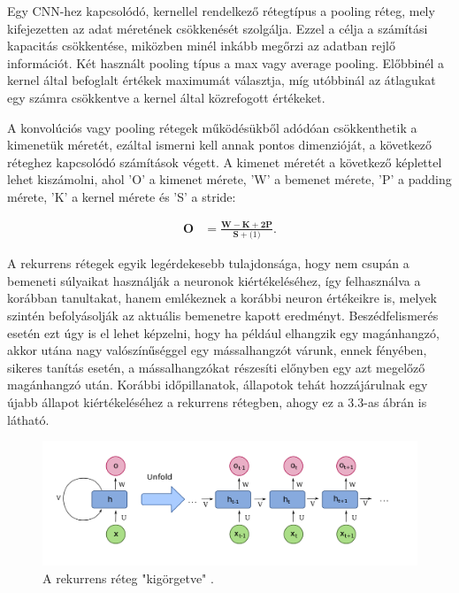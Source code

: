 Egy CNN-hez kapcsolódó, kernellel rendelkező rétegtípus a pooling réteg, mely kifejezetten az adat méretének csökkenését szolgálja. Ezzel a célja a számítási kapacitás csökkentése, miközben minél inkább megőrzi az adatban rejlő információt. Két használt pooling típus a max vagy average pooling. Előbbinél a kernel által befoglalt értékek maximumát választja, míg utóbbinál az átlagukat egy számra csökkentve a kernel által közrefogott értékeket.

A konvolúciós vagy pooling rétegek működésükből adódóan csökkenthetik a kimenetük méretét, ezáltal ismerni kell annak pontos dimenzióját, a következő réteghez kapcsolódó számítások végett. A kimenet méretét a következő képlettel lehet kiszámolni, ahol ’O’ a kimenet mérete, ’W’ a bemenet mérete, ’P’ a padding mérete, ’K’ a kernel mérete és ’S’ a stride:

\begin{align}
\mathbf{O}&=\frac{\mathbf{W}-\mathbf{K}+\mathbf{2P}}{\mathbf{S}+\mathbf(1)}.
\end{align}

A rekurrens rétegek\cite{rnn} egyik legérdekesebb tulajdonsága, hogy nem csupán a bemeneti súlyaikat használják a neuronok kiértékeléséhez, így felhasználva a korábban tanultakat, hanem emlékeznek a korábbi neuron értékeikre is, melyek szintén befolyásolják az aktuális bemenetre kapott eredményt. Beszédfelismerés esetén ezt úgy is el lehet képzelni, hogy ha például elhangzik egy magánhangzó, akkor utána nagy valószínűséggel egy mássalhangzót várunk, ennek fényében, sikeres tanítás esetén, a mássalhangzókat részesíti előnyben egy azt megelőző magánhangzó után. Korábbi időpillanatok, állapotok tehát hozzájárulnak egy újabb állapot kiértékeléséhez a rekurrens rétegben, ahogy ez a 3.3-as ábrán is látható.
 
\begin{figure}[!ht]
\centering
\includegraphics[width=140mm, keepaspectratio]{figures/rnn.png}
\caption{A rekurrens réteg "kigörgetve" \cite{rnn}.}
\end{figure}

